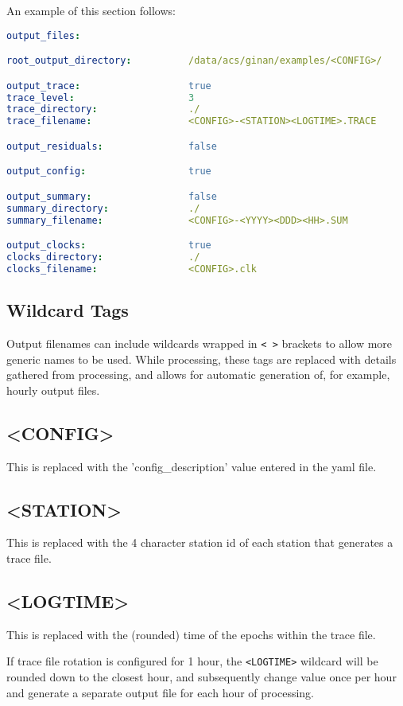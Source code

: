 An example of this section follows:
\begin{lstlisting}[language=yaml,caption=output\_files:]
output_files:

root_output_directory:          /data/acs/ginan/examples/<CONFIG>/

output_trace:                   true
trace_level:                    3
trace_directory:                ./
trace_filename:                 <CONFIG>-<STATION><LOGTIME>.TRACE

output_residuals:               false

output_config:                  true

output_summary:                 false
summary_directory:              ./
summary_filename:               <CONFIG>-<YYYY><DDD><HH>.SUM

output_clocks:                  true
clocks_directory:               ./
clocks_filename:                <CONFIG>.clk
\end{lstlisting}

\subsection{Wildcard Tags}
Output filenames can include wildcards wrapped in \lstinline{< >} brackets to allow more generic names to be used. While processing, these tags are replaced with details gathered from processing, and allows for automatic generation of, for example, hourly output files.

\subsection*{\textless CONFIG\textgreater}
This is replaced with the 'config\_description' value entered in the yaml file.
\subsection*{\textless STATION\textgreater}
This is replaced with the 4 character station id of each station that generates a trace file.
\subsection*{\textless LOGTIME\textgreater}
This is replaced with the (rounded) time of the epochs within the trace file.

If trace file rotation is configured for 1 hour, the \lstinline{<LOGTIME>} wildcard will be rounded down to the closest hour, and subsequently change value once per hour and generate a separate output file for each hour of processing.

